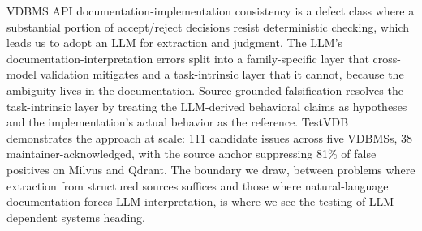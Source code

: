 \documentclass[sigconf]{acmart}
\begin{document}
VDBMS API documentation-implementation consistency is a defect class where a substantial portion of accept/reject decisions resist deterministic checking, which leads us to adopt an LLM for extraction and judgment. The LLM's documentation-interpretation errors split into a family-specific layer that cross-model validation mitigates and a task-intrinsic layer that it cannot, because the ambiguity lives in the documentation. Source-grounded falsification resolves the task-intrinsic layer by treating the LLM-derived behavioral claims as hypotheses and the implementation's actual behavior as the reference. TestVDB demonstrates the approach at scale: 111 candidate issues across five VDBMSs, 38 maintainer-acknowledged, with the source anchor suppressing 81\% of false positives on Milvus and Qdrant. The boundary we draw, between problems where extraction from structured sources suffices and those where natural-language documentation forces LLM interpretation, is where we see the testing of LLM-dependent systems heading.



\end{document}
